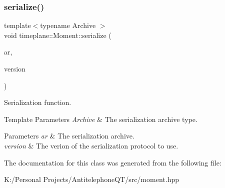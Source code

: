 \subsubsection{\texorpdfstring{serialize()}{serialize()}}
{\footnotesize\ttfamily template$<$typename Archive $>$ \\
void timeplane\+::\+Moment\+::serialize (\begin{DoxyParamCaption}\item[{Archive \&}]{ar,  }\item[{unsigned int const}]{version }\end{DoxyParamCaption})\hspace{0.3cm}{\ttfamily [inline]}}



Serialization function. 


\begin{DoxyTemplParams}{Template Parameters}
{\em Archive} & The serialization archive type. \\
\hline
\end{DoxyTemplParams}

\begin{DoxyParams}{Parameters}
{\em ar} & The serialization archive. \\
\hline
{\em version} & The verion of the serialization protocol to use. \\
\hline
\end{DoxyParams}


The documentation for this class was generated from the following file\+:\begin{DoxyCompactItemize}
\item 
K\+:/\+Personal Projects/\+Antitelephone\+Q\+T/src/moment.\+hpp\end{DoxyCompactItemize}
